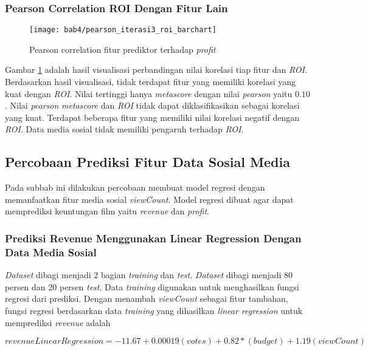 \subsubsection{Pearson Correlation ROI Dengan Fitur Lain}
\begin{figure}[H]
	\centering  
	\texttt{[image: bab4/pearson\_iterasi3\_roi\_barchart]}   
	\caption{Pearson correlation fitur prediktor terhadap \textit{profit}}	\label{fig:pearson_iterasi3_roi_barchart} 
\end{figure}

Gambar \ref{fig:pearson_iterasi3_roi_barchart} adalah hasil visualisasi perbandingan nilai korelasi tiap fitur dan \textit{ROI}. Berdasarkan hasil visualisasi, tidak terdapat fitur yang memiliki korelasi yang kuat dengan \textit{ROI}. Nilai tertinggi hanya \textit{metascore} dengan nilai \textit{pearson} yaitu $0.10$. Nilai \textit{pearson} \textit{metascore} dan \textit{ROI} tidak dapat diklasifikasikan sebagai korelasi yang kuat. Terdapat beberapa fitur yang memiliki nilai korelasi negatif dengan \textit{ROI}. Data media sosial tidak memiliki pengaruh terhadap \textit{ROI}. 


\subsection{Percobaan Prediksi Fitur Data Sosial Media}
Pada subbab ini dilakukan percobaan membuat model regresi dengan memanfaatkan fitur media sosial \textit{viewCount}. Model regresi dibuat agar dapat memprediksi keuntungan film yaitu \textit{revenue} dan \textit{profit}. 

\subsubsection{Prediksi Revenue Menggunakan Linear Regression Dengan Data Media Sosial} 
\textit{Dataset} dibagi menjadi 2 bagian \textit{training} dan \textit{test}. \textit{Dataset} dibagi menjadi 80 persen dan 20 persen \textit{test}. Data \textit{training} digunakan untuk menghasilkan fungsi regresi dari prediksi. Dengan menambah \textit{viewCount} sebagai fitur tambahan, fungsi regresi berdasarkan data \textit{training} yang dihasilkan \textit{linear regression} untuk memprediksi \textit{revenue} adalah 

\begin{equation}
revenueLinearRegression = -11.67 + 0.00019 (votes) + 0.82 * (budget) + 1.19 (viewCount)
\label{eqref:fungsilinear_revenue_iterasi3}
\end{equation}

